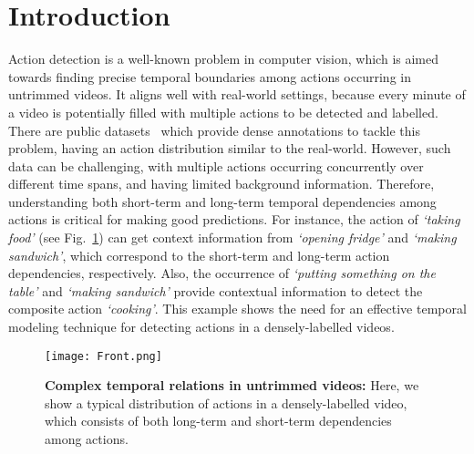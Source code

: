 \documentclass[10pt,twocolumn,letterpaper]{article}
\begin{document}
\section{Introduction}
\label{sec:intro}
Action detection is a well-known problem in computer vision, which is aimed towards finding precise temporal boundaries among actions occurring in untrimmed videos. 
It aligns well with real-world settings, because every minute of a video is potentially filled with multiple actions to be detected and labelled. 
There are public datasets~\cite{charades,dai2020toyota,multi-thumos} which provide dense annotations to tackle this problem, having an action distribution similar to the real-world. 
However, such data can be challenging, with multiple actions occurring concurrently over different time spans, and having limited background information. Therefore, understanding both short-term and long-term temporal dependencies among actions is critical for making good predictions.
For instance, the action of \textit{`taking food'} (see Fig.~\ref{fig:front}) can get context information from \textit{`opening fridge'} and \textit{`making sandwich'}, which correspond to the short-term and long-term action dependencies, respectively. Also, the occurrence of \textit{`putting something on the table'} and \textit{`making sandwich'} provide contextual information to detect the composite action \textit{`cooking'}. 
This example shows the need for an effective temporal modeling technique for detecting actions in a densely-labelled videos. 


\begin{figure}[t]
\centering
\texttt{[image: Front.png]}
\caption{\textbf{Complex temporal relations in untrimmed videos:} Here, we show a typical distribution of actions in a densely-labelled video, which consists of both long-term and short-term dependencies among actions. }
\label{fig:front}
\end{figure}
\end{document}
